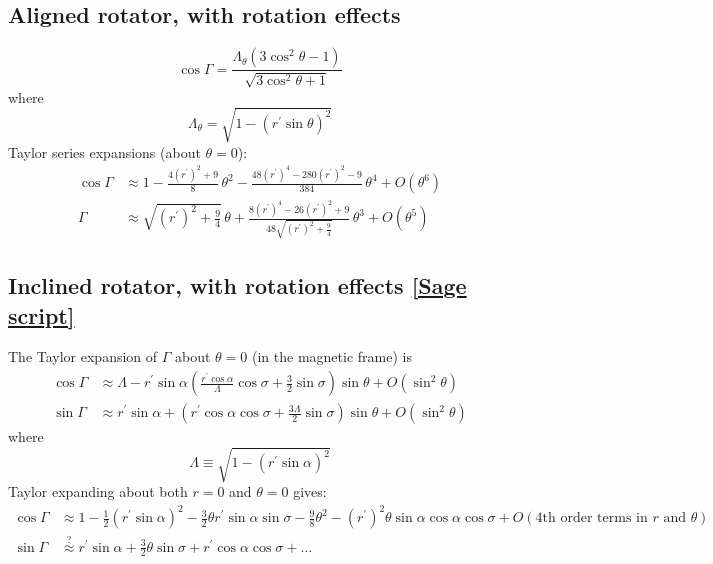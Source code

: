 \documentclass{book}
\newcommand{\linktosage}[1]{\hyperref[#1]{[Sage script]}}
\begin{document}
\subsection{Aligned rotator, with rotation effects}
\begin{equation}
    \cos\Gamma = \frac{\Lambda_\theta(3\cos^2\theta-1)}{\sqrt{3\cos^2\theta+1}}
\end{equation}
where
\begin{equation}
    \Lambda_\theta = \sqrt{1 - (r^\prime\sin\theta)^2}
\end{equation}
Taylor series expansions (about $\theta = 0$):
\begin{equation}
    \begin{aligned}
        \cos\Gamma &\approx 1 - \frac{4(r^\prime)^2+9}{8}\,\theta^2 -
                            \frac{48(r^\prime)^4 - 280(r^\prime)^2 - 9}{384}\,\theta^4 + O(\theta^6) \\
        \Gamma &\approx \sqrt{(r^\prime)^2 + \frac94}\,\theta +
                        \frac{8(r^\prime)^4 - 26(r^\prime)^2 + 9}{48\sqrt{(r^\prime)^2 + \frac94}}\,\theta^3 + O(\theta^5)
    \end{aligned}
\end{equation}

\subsection{Inclined rotator, with rotation effects \linktosage{sage:Gamma}}

The Taylor expansion of $\Gamma$ about $\theta = 0$ (in the magnetic frame) is
\begin{equation}
    \begin{aligned}
        \cos\Gamma &\approx \Lambda - r^\prime\sin\alpha
            \left(\frac{r^\prime\cos\alpha}{\Lambda}\cos\sigma +
                  \frac32\sin\sigma\right)\sin\theta + O(\sin^2\theta) \\
        \sin\Gamma &\approx r^\prime\sin\alpha +
            \left(r^\prime\cos\alpha\cos\sigma + \frac{3\Lambda}{2}\sin\sigma\right)\sin\theta +
            O(\sin^2\theta)
    \end{aligned}
\end{equation}
where
\begin{equation}
    \Lambda \equiv \sqrt{1-(r^\prime\sin\alpha)^2}
\end{equation}
Taylor expanding about both $r = 0$ and $\theta = 0$ gives:
\begin{equation}
    \begin{aligned}
        \cos\Gamma &\approx 1 - \frac12(r^\prime\sin\alpha)^2 -
            \frac32\theta r^\prime\sin\alpha\sin\sigma -
            \frac98\theta^2 - (r^\prime)^2\theta\sin\alpha\cos\alpha\cos\sigma +
            O(\text{4th order terms in $r$ and $\theta$}) \\
        \sin\Gamma &\stackrel{?}{\approx} r^\prime\sin\alpha + \frac32\theta\sin\sigma + r^\prime\cos\alpha\cos\sigma + \dots
    \end{aligned}
\end{equation}
\end{document}
